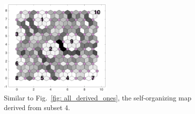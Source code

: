 \begin{figure}
        \centering
         \includegraphics[width=0.5\textwidth]{../../images0.01/M31/2D/image_subsets/subset2_dist_with_hits_t.png}
    \caption{Similar to Fig.~\ref{fig: all_derived_ones}, the self-organizing map derived from subset 4.}
    \label{fig: subset2}
\end{figure}
